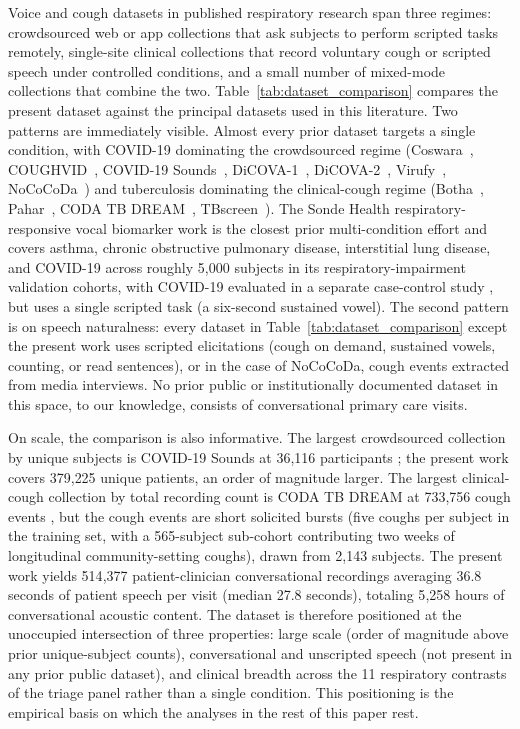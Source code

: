 \documentclass[utf8]{FrontiersinHarvard} %
\begin{document}
Voice and cough datasets in published respiratory research span three regimes: crowdsourced web or app collections that ask subjects to perform scripted tasks remotely, single-site clinical collections that record voluntary cough or scripted speech under controlled conditions, and a small number of mixed-mode collections that combine the two. Table~\ref{tab:dataset_comparison} compares the present dataset against the principal datasets used in this literature. Two patterns are immediately visible. Almost every prior dataset targets a single condition, with COVID-19 dominating the crowdsourced regime (Coswara~\citep{coswara-2020}, COUGHVID~\citep{coughvid-2020}, COVID-19 Sounds~\citep{covid-19-sounds-xia-2021}, DiCOVA-1~\citep{dicova-1-2021}, DiCOVA-2~\citep{dicova-2-2022}, Virufy~\citep{virufy-open-cough-2020}, NoCoCoDa~\citep{nococoda-2020}) and tuberculosis dominating the clinical-cough regime (Botha~\citep{botha-tb-cough-2018}, Pahar~\citep{pahar-tb-cough-2021}, CODA TB DREAM~\citep{coda-tb-dream-2024}, TBscreen~\citep{tbscreen-2024}). The Sonde Health respiratory-responsive vocal biomarker work is the closest prior multi-condition effort and covers asthma, chronic obstructive pulmonary disease, interstitial lung disease, and COVID-19 across roughly 5{,}000 subjects in its respiratory-impairment validation cohorts, with COVID-19 evaluated in a separate case-control study \citep{sonde-rrvb-jmir-2023}, but uses a single scripted task (a six-second sustained vowel). The second pattern is on speech naturalness: every dataset in Table~\ref{tab:dataset_comparison} except the present work uses scripted elicitations (cough on demand, sustained vowels, counting, or read sentences), or in the case of NoCoCoDa, cough events extracted from media interviews. No prior public or institutionally documented dataset in this space, to our knowledge, consists of conversational primary care visits.

On scale, the comparison is also informative. The largest crowdsourced collection by unique subjects is COVID-19 Sounds at 36{,}116 participants \citep{covid-19-sounds-xia-2021}; the present work covers 379{,}225 unique patients, an order of magnitude larger. The largest clinical-cough collection by total recording count is CODA TB DREAM at 733{,}756 cough events \citep{coda-tb-dream-2024}, but the cough events are short solicited bursts (five coughs per subject in the training set, with a 565-subject sub-cohort contributing two weeks of longitudinal community-setting coughs), drawn from 2{,}143 subjects. The present work yields 514{,}377 patient-clinician conversational recordings averaging 36.8 seconds of patient speech per visit (median 27.8 seconds), totaling 5{,}258 hours of conversational acoustic content. The dataset is therefore positioned at the unoccupied intersection of three properties: large scale (order of magnitude above prior unique-subject counts), conversational and unscripted speech (not present in any prior public dataset), and clinical breadth across the 11 respiratory contrasts of the triage panel rather than a single condition. This positioning is the empirical basis on which the analyses in the rest of this paper rest.
\end{document}
